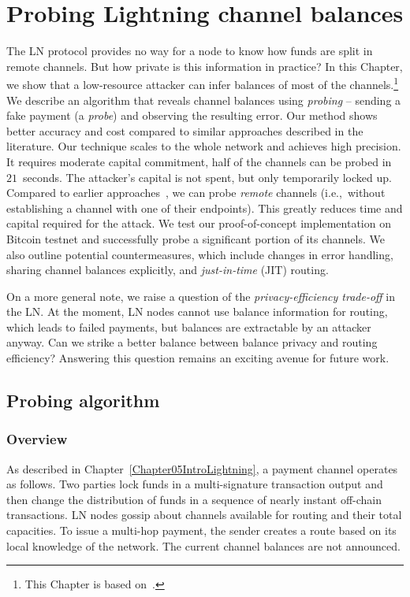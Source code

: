 \chapter{Probing Lightning channel balances}

\label{Chapter06LNprobing}

The LN protocol provides no way for a node to know how funds are split in remote channels.
But how private is this information in practice?
In this Chapter, we show that a low-resource attacker can infer balances of most of the channels.\footnote{This Chapter is based on~\cite{Tikhomirov2020}.}
We describe an algorithm that reveals channel balances using \textit{probing} -- sending a fake payment (a \textit{probe}) and observing the resulting error.
Our method shows better accuracy and cost compared to similar approaches described in the literature.
Our technique scales to the whole network and achieves high precision.
It requires moderate capital commitment, half of the channels can be probed in $21$~seconds.
The attacker's capital is not spent, but only temporarily locked up.
Compared to earlier approaches~\cite{HerreraJoancomarti2019, Dam2019}, we can probe \textit{remote} channels (i.e.,~without establishing a channel with one of their endpoints).
This greatly reduces time and capital required for the attack.
We test our proof-of-concept implementation on Bitcoin testnet and successfully probe a significant portion of its channels.
We also outline potential countermeasures, which include changes in error handling, sharing channel balances explicitly, and \textit{just-in-time} (JIT) routing.

On a more general note, we raise a question of the \textit{privacy-efficiency trade-off} in the LN\@.
At the moment, LN nodes cannot use balance information for routing, which leads to failed payments, but balances are extractable by an attacker anyway.
Can we strike a better balance between balance privacy and routing efficiency?
Answering this question remains an exciting avenue for future work.


\section{Probing algorithm}
\label{sec:probing}

\subsection{Overview}

As described in Chapter~\ref{Chapter05IntroLightning}, a payment channel operates as follows.
Two parties lock funds in a multi-signature transaction output and then change the distribution of funds in a sequence of nearly instant off-chain transactions.
LN nodes gossip about channels available for routing and their total capacities.
To issue a multi-hop payment, the sender creates a route based on its local knowledge of the network.
The current channel balances are not announced.

